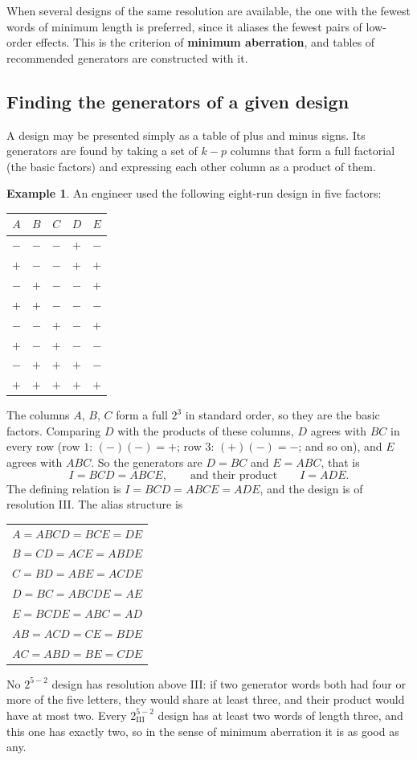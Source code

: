 \documentclass[11pt,a4paper]{article}
\numberwithin{equation}{section}
\theoremstyle{definition}
\newtheorem{exa}[thm]{Example}
\begin{document}
When several designs of the same resolution are available, the one with the fewest words of minimum length is preferred, since it aliases the
fewest pairs of low-order effects. This is the criterion of \textbf{minimum aberration}, and tables of recommended generators are constructed with it.

\subsection{Finding the generators of a given design}
A design may be presented simply as a table of plus and minus signs. Its generators are found by taking a set of $k - p$ columns that form a full
factorial (the basic factors) and expressing each other column as a product of them.

\begin{exa}\label{exa:find-generators}
An engineer used the following eight-run design in five factors:
\begin{center}
\begin{tabular}{ccccc}
$A$ & $B$ & $C$ & $D$ & $E$ \\
\hline
$-$ & $-$ & $-$ & $+$ & $-$ \\
$+$ & $-$ & $-$ & $+$ & $+$ \\
$-$ & $+$ & $-$ & $-$ & $+$ \\
$+$ & $+$ & $-$ & $-$ & $-$ \\
$-$ & $-$ & $+$ & $-$ & $+$ \\
$+$ & $-$ & $+$ & $-$ & $-$ \\
$-$ & $+$ & $+$ & $+$ & $-$ \\
$+$ & $+$ & $+$ & $+$ & $+$
\end{tabular}
\end{center}
The columns $A$, $B$, $C$ form a full $2^3$ in standard order, so they are the basic factors. Comparing $D$ with the products of these columns, $D$ agrees
with $BC$ in every row (row $1$: $(-)(-) = +$; row $3$: $(+)(-) = -$; and so on), and $E$ agrees with $ABC$. So the generators are $D = BC$ and $E = ABC$, that is
\[
I = BCD = ABCE , \qquad\text{and their product}\qquad I = ADE .
\]
The defining relation is $I = BCD = ABCE = ADE$, and the design is of resolution III. The alias structure is
\begin{center}
\begin{tabular}{l}
$A = ABCD = BCE = DE$ \\
$B = CD = ACE = ABDE$ \\
$C = BD = ABE = ACDE$ \\
$D = BC = ABCDE = AE$ \\
$E = BCDE = ABC = AD$ \\
$AB = ACD = CE = BDE$ \\
$AC = ABD = BE = CDE$
\end{tabular}
\end{center}
No $2^{5-2}$ design has resolution above III: if two generator words both had four or more of the five letters, they would share at least three,
and their product would have at most two. Every $2^{5-2}_{\mathrm{III}}$ design has at least two words of length three, and this one has exactly two, so in the
sense of minimum aberration it is as good as any.
\end{exa}
\end{document}

